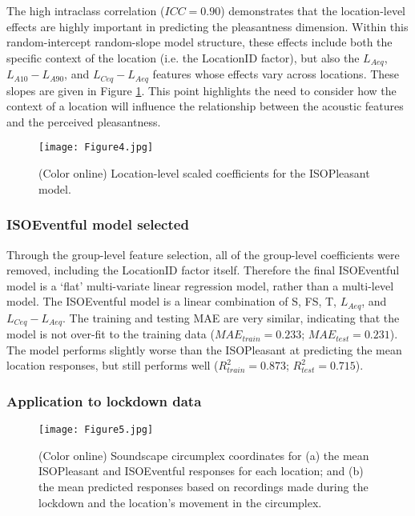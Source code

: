The high intraclass correlation ($ICC = 0.90$) demonstrates that the location-level effects are highly important in predicting the pleasantness dimension. Within this random-intercept random-slope model structure, these effects include both the specific context of the location (i.e. the LocationID factor), but also the $L_{Aeq}$, $L_{A10}-L_{A90}$, and $L_{Ceq}-L_{Aeq}$ features whose effects vary across locations. These slopes are given in Figure \ref{fig:random}. This point highlights the need to consider how the context of a location will influence the relationship between the acoustic features and the perceived pleasantness. 

\begin{figure}
    \centering
    \texttt{[image: Figure4.jpg]}
    \caption{(Color online) Location-level scaled coefficients for the ISOPleasant model.}
    \label{fig:random}
\end{figure}

\subsubsection{ISOEventful model selected}

Through the group-level feature selection, all of the group-level coefficients were removed, including the LocationID factor itself. Therefore the final ISOEventful model is a ‘flat’ multi-variate linear regression model, rather than a multi-level model. The ISOEventful model is a linear combination of S, FS, T, $L_{Aeq}$, and $L_{Ceq}-L_{Aeq}$. The training and testing MAE are very similar, indicating that the model is not over-fit to the training data ($MAE_{train} = 0.233$; $MAE_{test} = 0.231$). The model performs slightly worse than the ISOPleasant at predicting the mean location responses, but still performs well ($R^2_{train} = 0.873$; $R^2_{test} = 0.715$). 

\subsubsection{Application to lockdown data}

\begin{figure}
    \centering
    \texttt{[image: Figure5.jpg]}
    \caption{(Color online) Soundscape circumplex coordinates for (a) the mean ISOPleasant and ISOEventful responses for each location; and (b) the mean predicted responses based on recordings made during the lockdown and the location's movement in the circumplex.}
    \label{fig:locations}
\end{figure}

